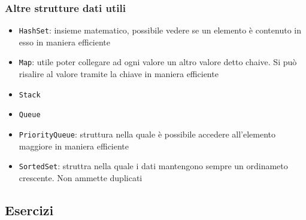 \subsubsection{Altre strutture dati utili}
\begin{itemize}
	\item \verb|HashSet|: insieme matematico, possibile vedere se un elemento è contenuto in esso in maniera efficiente
	\item \verb|Map|: utile poter collegare ad ogni valore un altro valore detto chaive. Si può risalire al valore tramite la chiave in maniera efficiente
	\item \verb|Stack|
	\item \verb|Queue|
	\item \verb|PriorityQueue|: struttura nella quale è possibile accedere all'elemento maggiore in maniera efficiente
	\item \verb|SortedSet|: struttra nella quale i dati mantengono sempre un ordinameto crescente. Non ammette duplicati
\end{itemize}
\subsection{Esercizi}

